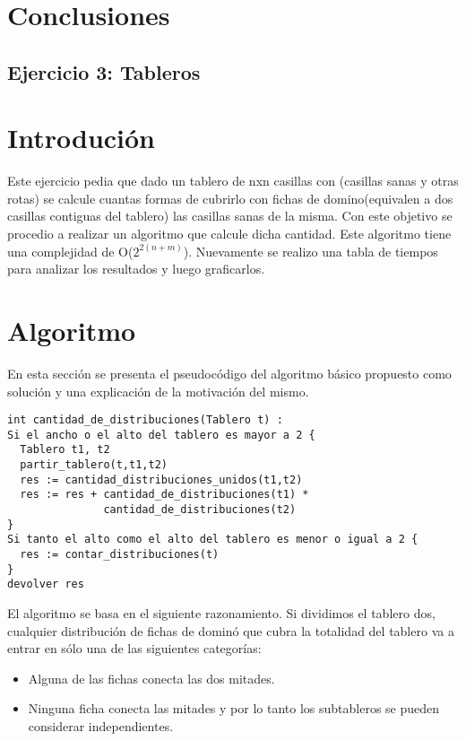 \documentclass[a4paper, 12pt] {article}
\begin{document}
\section*{Conclusiones}
\newpage

\begin{center}
 \section*{Ejercicio 3: Tableros}
\end{center}

\bigskip
\section*{Introduci\'on}
Este ejercicio pedia que dado un tablero de nxn casillas con (casillas sanas y otras rotas) se calcule cuantas formas de cubrirlo con fichas de domino(equivalen a dos casillas contiguas del tablero) las casillas sanas de la misma.
Con este objetivo se procedio a realizar un algoritmo que calcule dicha cantidad. Este algoritmo tiene una complejidad de O($2^{2\left(n+m \right) }$). Nuevamente se realizo una tabla de tiempos para analizar los resultados y luego graficarlos. 
\section*{Algoritmo}
En esta secci\'on se presenta el pseudoc\'odigo del algoritmo b\'asico propuesto como soluci\'on y una explicaci\'on de la motivaci\'on del mismo.
\begin{verbatim}
int cantidad_de_distribuciones(Tablero t) :
Si el ancho o el alto del tablero es mayor a 2 {
  Tablero t1, t2
  partir_tablero(t,t1,t2)
  res := cantidad_distribuciones_unidos(t1,t2) 
  res := res + cantidad_de_distribuciones(t1) * 
               cantidad_de_distribuciones(t2)
}
Si tanto el alto como el alto del tablero es menor o igual a 2 {
  res := contar_distribuciones(t)
}
devolver res
\end{verbatim}

El algoritmo se basa en el siguiente razonamiento.
Si dividimos el tablero dos, cualquier distribuci\'on de fichas de domin\'o que cubra la totalidad del tablero va a entrar en s\'olo una de las siguientes categor\'ias:
\begin{itemize}
 \item Alguna de las fichas conecta las dos mitades.
 \item Ninguna ficha conecta las mitades y por lo tanto los subtableros se pueden considerar independientes.
\end{itemize} 
\end{document}
